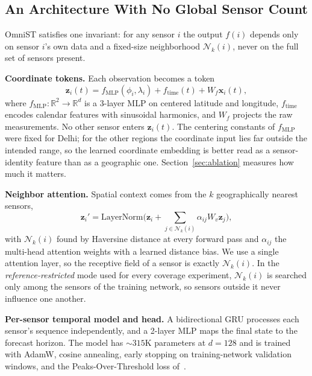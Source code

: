\documentclass[journal,twoside,web]{ieeecolor}
\begin{document}
\subsection{An Architecture With No Global Sensor Count}

OmniST satisfies one invariant: for any sensor $i$ the output $f(i)$ depends only on sensor $i$'s own
data and a fixed-size neighborhood $\mathcal{N}_k(i)$, never on the full set of sensors present.

\textbf{Coordinate tokens.} Each observation becomes a token
\begin{equation}
\mathbf{z}_i(t) = f_{\text{MLP}}(\phi_i, \lambda_i) + f_{\text{time}}(t) + W_f \mathbf{x}_i(t),
\end{equation}
where $f_{\text{MLP}}:\mathbb{R}^2\to\mathbb{R}^d$ is a 3-layer MLP on centered latitude and longitude,
$f_{\text{time}}$ encodes calendar features with sinusoidal harmonics, and $W_f$ projects the raw
measurements. No other sensor enters $\mathbf{z}_i(t)$. The centering constants of
$f_{\text{MLP}}$ were fixed for Delhi; for the other regions the coordinate input lies far outside the
intended range, so the learned coordinate embedding is better read as a sensor-identity feature than
as a geographic one. Section~\ref{sec:ablation} measures how much it matters.

\textbf{Neighbor attention.} Spatial context comes from the $k$ geographically nearest sensors,
\begin{equation}
\mathbf{z}_i' = \text{LayerNorm}\Big(\mathbf{z}_i + \sum_{j \in \mathcal{N}_k(i)} \alpha_{ij} W_v \mathbf{z}_j\Big),
\end{equation}
with $\mathcal{N}_k(i)$ found by Haversine distance at every forward pass and $\alpha_{ij}$ the
multi-head attention weights with a learned distance bias. We use a single attention layer, so the
receptive field of a sensor is exactly $\mathcal{N}_k(i)$. In the \emph{reference-restricted} mode
used for every coverage experiment, $\mathcal{N}_k(i)$ is searched only among the sensors of the
training network, so sensors outside it never influence one another.

\textbf{Per-sensor temporal model and head.} A bidirectional GRU processes each sensor's sequence
independently, and a 2-layer MLP maps the final state to the forecast horizon. The model has
${\sim}315$K parameters at $d{=}128$ and is trained with AdamW, cosine annealing, early stopping on
training-network validation windows, and the Peaks-Over-Threshold loss of~\cite{panja2026estgcn}.
\end{document}
